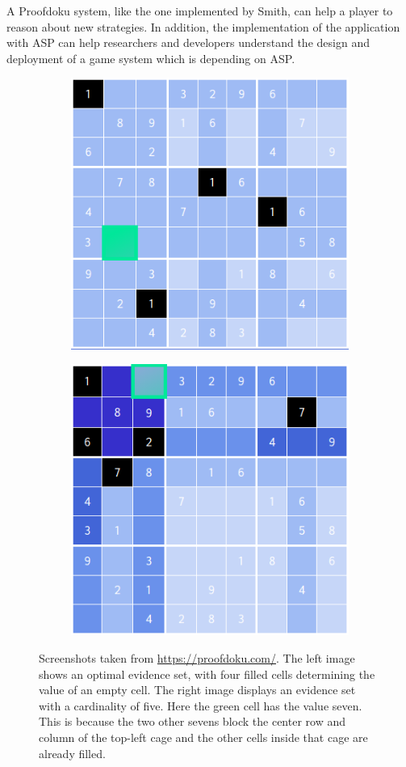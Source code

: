\documentclass[runningheads]{llncs}
\newcommand{\authorquote}{Smith}
\begin{document}
A Proofdoku system, like the one implemented by \authorquote{}, can help a player to reason about new strategies. In addition, the implementation of the application with ASP can help researchers and developers understand the design and deployment of a game system which is depending on ASP. 


\begin{figure}
\begin{subfigure}{0.5\textwidth}
  \centering
  \includegraphics[width=.8\linewidth]{Answer_Set_Programming_in_Proofdoku/4_evidence_set.png}
\end{subfigure}%
\begin{subfigure}{0.5\textwidth}
  \centering
  \includegraphics[width=.8\linewidth]{Answer_Set_Programming_in_Proofdoku/5_evidence_set.png}
\end{subfigure}
\caption{Screenshots taken from \url{https://proofdoku.com/}. The left image shows an optimal evidence set, with four filled cells determining the value of an empty cell. The right image displays an evidence set with a cardinality of five. Here the green cell has the value seven. This is because the two other sevens block the center row and column of the top-left cage and the other cells inside that cage are already filled.}
\label{fig:proofdoku}
\end{figure}
\end{document}

